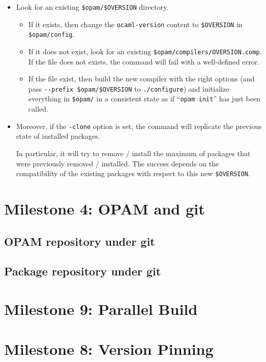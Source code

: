 \documentclass[a4paper,11pt]{article}
\begin{document}
\begin{itemize}
\item Look for an existing \verb+$opam/$OVERSION+ directory. 

\begin{itemize}
\item If it
  exists, then change the {\tt ocaml-version} content to
  \verb+$OVERSION+ in  \verb+$opam/config+.

\item If it does not exist, look for an existing
  \verb+$opam/compilers/OVERSION.comp+. If the file does not exists,
  the command will fail with a well-defined error.

\item If the file exist, then build the new compiler with the right
  options (and pass \verb+--prefix $opam/$OVERSION+ to
  \verb+./configure+) and initialize everything in \verb+$opam/+ 
  in a consistent state as if ``\verb+opam init+'' has just been called.

\end{itemize}
\item Moreover, if the \verb+-clone+ option is set, the command will
  replicate the previous state of installed packages. 

  In particular, it will try to remove / install the maximum of packages 
  that were previously removed / installed.
  The success depends on the compatibility of the existing packages 
  with respect to this new \verb+$OVERSION+.

\end{itemize}

\section{Milestone 4: OPAM and git}

\subsection{OPAM repository under git}

\subsection{Package repository under git}


\section{Milestone 9: Parallel Build}

\section{Milestone 8: Version Pinning}
\end{document}
